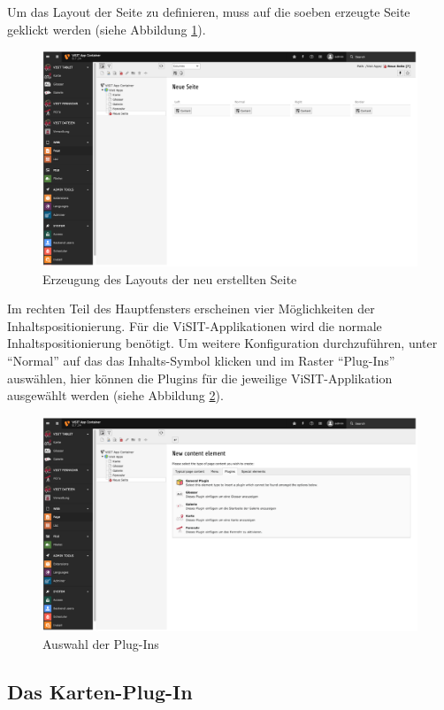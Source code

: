 Um das Layout der Seite zu definieren, muss auf die soeben erzeugte Seite geklickt werden (siehe Abbildung \ref{img:layout_erzeugung}).

\begin{figure}[ht!]
\centering
\includegraphics[width=12cm]{Figures/paula/typo3/layout_erzeugung.png}
\caption{Erzeugung des Layouts der neu erstellten Seite}
\label{img:layout_erzeugung}
\end{figure}

Im rechten Teil des Hauptfensters erscheinen vier Möglichkeiten der Inhaltspositionierung. Für die ViSIT-Applikationen wird die normale Inhaltspositionierung benötigt.  Um weitere Konfiguration durchzuführen, unter “Normal” auf das das Inhalts-Symbol klicken und im Raster “Plug-Ins” auswählen, hier können die Plugins für die jeweilige ViSIT-Applikation ausgewählt werden (siehe Abbildung \ref{img:auswahl_plugins}).

\begin{figure}[ht!]
\centering
\includegraphics[width=12cm]{Figures/paula/typo3/auswahl_plugins.png}
\caption{Auswahl der Plug-Ins}
\label{img:auswahl_plugins}
\end{figure}

\subsection{Das Karten-Plug-In}

